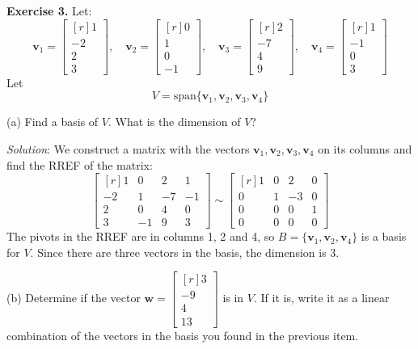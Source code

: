 \documentclass[12pt]{article}
\begin{document}
\bigskip
\textbf{Exercise 3.} Let:
\[
\mathbf{v}_1=\left[\begin{matrix*}[r]1\\-2\\2\\3\end{matrix*}\right],\quad
\mathbf{v}_2=\left[\begin{matrix*}[r]0\\1\\0\\-1\end{matrix*}\right],\quad
\mathbf{v}_3=\left[\begin{matrix*}[r]2\\-7\\4\\9\end{matrix*}\right],\quad
\mathbf{v}_4=\left[\begin{matrix*}[r]1\\-1\\0\\3\end{matrix*}\right]
\]
Let
\[
V=\text{span}\{\mathbf{v}_1,\mathbf{v}_2,\mathbf{v}_3,\mathbf{v}_4\}
\]

\medskip
(a) Find a basis of $V$. What is the dimension of $V$?

\emph{Solution}: We construct a matrix with the vectors $\mathbf{v}_1,\mathbf{v}_2,\mathbf{v}_3,\mathbf{v}_4$ on its columns and find the RREF of the matrix:
\[
\left[\begin{matrix*}[r]1 & 0 & 2 & 1\\-2 & 1 & -7 & -1\\2 & 0 & 4 & 0\\3 & -1 & 9 & 3\end{matrix*}\right]\sim
\left[\begin{matrix*}[r]1 & 0 & 2 & 0\\0 & 1 & -3 & 0\\0 & 0 & 0 & 1\\0 & 0 & 0 & 0\end{matrix*}\right]
\]
The pivots in the RREF are in columns 1, 2 and 4, so $B=\{\mathbf{v}_1,\mathbf{v}_2,\mathbf{v}_4\}$ is a basis for $V$. Since there are three vectors in the basis, the dimension is $3$.
\proofend

\medskip
(b) Determine if the vector $\mathbf{w}=\left[\begin{matrix*}[r]3\\-9\\4\\13\end{matrix*}\right]$ is in $V$. If it is, write it as a linear combination of the vectors in the basis you found in the previous item.
\end{document}
